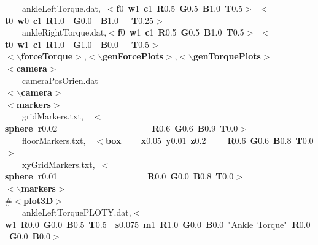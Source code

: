 \documentclass[singlecolumn,12pt]{article}
\newcommand{\hlstd}[1]{\textcolor[rgb]{0,0,0}{#1}}
\newcommand{\hlkey}[1]{\textcolor[rgb]{0,0,1}{\bf{#1}}}
\newcommand{\hlnum}[1]{\textcolor[rgb]{0.66,0,0.66}{#1}}
\newcommand{\hlstr}[1]{\textcolor[rgb]{1,0,0}{#1}}
\begin{document}
\begin{landscape}
{\hlstd{\ \ \ \ }ankleLeftTorque.dat,\ }\hlkey{$<$f}\hlnum{0\ }\hlkey{w}\hlnum{1\ }\hlkey{c}\hlnum{1\ }\hlkey{R}\hlnum{0.5\ }\hlkey{G}\hlnum{0.5\ }\hlkey{B}\hlnum{1.0\ }\hlkey{T}\hlnum{0.5}\hlkey{$>$}\hlstd{\ }\hlkey{$<$t}\hlnum{0\ }\hlkey{w}\hlnum{0\ }\hlkey{c}\hlnum{1\ }\hlkey{R}\hlnum{1.0\hlstd{\ \ }}\hlkey{G}\hlnum{0.0\hlstd{\ \ }}\hlkey{B}\hlnum{1.0\ \ \ }\hlkey{T}\hlnum{0.25}\hlkey{$>$}\hlstd{\\
\hlstd{\ \ \ \ }ankleRightTorque.dat,}\hlkey{$<$f}\hlnum{0\ }\hlkey{w}\hlnum{1\ }\hlkey{c}\hlnum{1\ }\hlkey{R}\hlnum{0.5\ }\hlkey{G}\hlnum{0.5\ }\hlkey{B}\hlnum{1.0\ }\hlkey{T}\hlnum{0.5}\hlkey{$>$}\hlstd{\ }\hlkey{$<$t}\hlnum{0\ }\hlkey{w}\hlnum{1\ }\hlkey{c}\hlnum{1\ }\hlkey{R}\hlnum{1.0\hlstd{\ \ }}\hlkey{G}\hlnum{1.0\hlstd{\ \ }}\hlkey{B}\hlnum{0.0\ \ \ }\hlkey{T}\hlnum{0.5}\hlkey{$>$}\hlstd{\\
}\hlkey{$<$$\backslash$forceTorque$>$}\hlstd{,}\hlkey{$<$$\backslash$genForcePlots$>$}\hlstd{,}\hlkey{$<$$\backslash$genTorquePlots$>$}\hlstd{\\
}\hlkey{$<$camera$>$}\hlstd{\\
\hlstd{\ \ \ \ }cameraPosOrien.dat\\
}\hlkey{$<$$\backslash$camera$>$}\hlstd{\\
}\hlkey{$<$markers$>$}\hlstd{\\
\hlstd{\ \ \ \ }gridMarkers.txt,\hlstd{\ \ }}\hlkey{$<$sphere\ r}\hlnum{0.02\hlstd{\ \ \ \ \ \ \ \ \ \ \ \ \ \ \ \ \ \ \ \ \ \ }}\hlkey{R}\hlnum{0.6\ }\hlkey{G}\hlnum{0.6\ }\hlkey{B}\hlnum{0.9\ }\hlkey{T}\hlnum{0.0}\hlkey{$>$}\hlstd{\\
\hlstd{\ \ \ \ }floorMarkers.txt,\hlstd{\ \ }}\hlkey{$<$box\hlstd{\ \ \ \ }x}\hlnum{0.05\ }\hlkey{y}\hlnum{0.01\ }\hlkey{z}\hlnum{0.2\hlstd{\ \ \ \ \ }}\hlkey{R}\hlnum{0.6\ }\hlkey{G}\hlnum{0.6\ }\hlkey{B}\hlnum{0.8\ }\hlkey{T}\hlnum{0.0}\hlkey{$>$}\hlstd{\\
\hlstd{\ \ \ \ }xyGridMarkers.txt,\ }\hlkey{$<$sphere\ r}\hlnum{0.01\hlstd{\ \ \ \ \ \ \ \ \ \ \ \ \ \ \ \ \ \ \ \ \ }}\hlkey{R}\hlnum{0.0\ }\hlkey{G}\hlnum{0.0\ }\hlkey{B}\hlnum{0.8\ }\hlkey{T}\hlnum{0.0}\hlkey{$>$}\hlstd{\\
}\hlkey{$<$$\backslash$markers$>$}\hlstd{\\
\#}\hlkey{$<$plot3D$>$}\hlstd{\\
\hlstd{\ \ \ \ }ankleLeftTorquePLOTY.dat,}\hlkey{$<$w}\hlnum{1\ }\hlkey{R}\hlnum{0.0\ }\hlkey{G}\hlnum{0.0\ }\hlkey{B}\hlnum{0.5\ }\hlkey{T}\hlnum{0.5\hlstd{\ \ }}\hlkey{s}\hlnum{0.075\ }\hlkey{m}\hlnum{1\ }\hlkey{R}\hlnum{1.0\ }\hlkey{G}\hlnum{0.0\ }\hlkey{B}\hlnum{0.0\ }\hlkey{}\hlstr{"Ankle\ Torque"}\hlkey{\ R}\hlnum{0.0\ }\hlkey{G}\hlnum{0.0\ }\hlkey{B}\hlnum{0.0}\hlkey{$>$}\hlstd{\\
}
\end{landscape}
\end{document}
